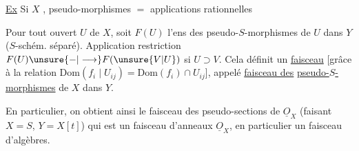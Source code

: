 
\uline{Ex} Si $X$  , pseudo-morphismes $=$ applications rationnelles

Pour tout ouvert $U$ de $X$, soit $F(U)$ l'ens des pseudo-$S$-morphismes de $U$ dans $Y$ ($S$-schém. séparé). Application restriction $F(U)\unsure{\mathord{-}|\longrightarrow}F(\unsure{V|U})$ si $U\supset V$. Cela  définit un \uline{faisceau} [grâce à la relation $\mathrm{Dom}(f_i\mid U_{ij})=\mathrm{Dom}(f_i)\cap U_{ij}$], appelé \uline{faisceau des}  \uline{pseudo-$S$-morphismes} de $X$ dans $Y$.

En particulier, on obtient ainsi le faisceau des pseudo-sections de $\underline O_X$ (faisant $X=S$, $Y=X[t]$) qui est un faisceau d'anneaux \uline{} $\underline O_X$, en particulier un faisceau d'algèbres.


